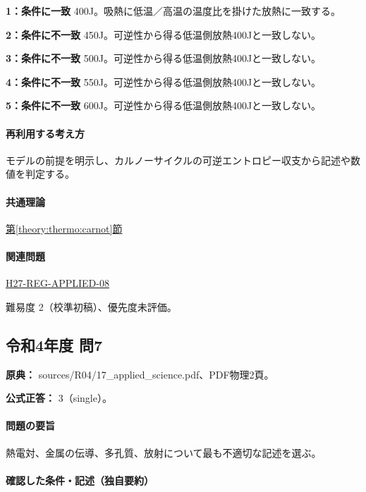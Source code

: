 \noindent\textbf{1：条件に一致} 400J。吸熱に低温／高温の温度比を掛けた放熱に一致する。\par

\noindent\textbf{2：条件に不一致} 450J。可逆性から得る低温側放熱400Jと一致しない。\par

\noindent\textbf{3：条件に不一致} 500J。可逆性から得る低温側放熱400Jと一致しない。\par

\noindent\textbf{4：条件に不一致} 550J。可逆性から得る低温側放熱400Jと一致しない。\par

\noindent\textbf{5：条件に不一致} 600J。可逆性から得る低温側放熱400Jと一致しない。\par

\paragraph{再利用する考え方} モデルの前提を明示し、カルノーサイクルの可逆エントロピー収支から記述や数値を判定する。

\paragraph{共通理論} \hyperref[theory:thermo:carnot]{第\ref*{theory:thermo:carnot}節}

\paragraph{関連問題} \hyperref[q:h27-reg-applied-08]{H27-REG-APPLIED-08}

\par 難易度 2（校準初稿）、優先度未評価。

\subsection{令和4年度 問7}
\label{q:r04-reg-applied-07}

\noindent\textbf{原典：} sources/R04/17\_applied\_science.pdf、PDF物理2頁。

\textbf{公式正答：} 3（single）。

\paragraph{問題の要旨} 熱電対、金属の伝導、多孔質、放射について最も不適切な記述を選ぶ。

\paragraph{確認した条件・記述（独自要約）}\mbox{}\par

